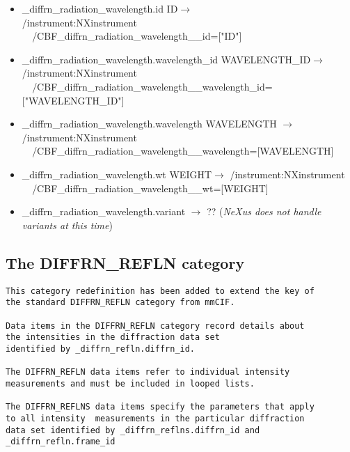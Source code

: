 \documentclass[11pt]{article}
\begin{document}
{{{\begin{verbatim}
\end{verbatim}}


\begin{itemize}

\item{\_diffrn\_radiation\_wavelength.id ID$\rightarrow$ \\
/instrument:NXinstrument \\
\verb|  |/CBF\_diffrn\_radiation\_wavelength\_\_id=["ID"]
}
\item{\_diffrn\_radiation\_wavelength.wavelength\_id WAVELENGTH\_ID$\rightarrow$ \\
/instrument:NXinstrument \\
\verb|  |/CBF\_diffrn\_radiation\_wavelength\_\_wavelength\_id=["WAVELENGTH\_ID"] \\
}
\item{\_diffrn\_radiation\_wavelength.wavelength WAVELENGTH $\rightarrow$ \\
/instrument:NXinstrument \\
\verb|  |/CBF\_diffrn\_radiation\_wavelength\_\_wavelength=[WAVELENGTH] \\
}
\item{\_diffrn\_radiation\_wavelength.wt WEIGHT$\rightarrow$
/instrument:NXinstrument \\
\verb|  |/CBF\_diffrn\_radiation\_wavelength\_\_wt=[WEIGHT] \\
}

\item{\_diffrn\_radiation\_wavelength.variant $\rightarrow$ ?? ({\it NeXus does not handle variants at this time})}
\end{itemize}

\subsection{The DIFFRN\_REFLN category}

\footnotesize{\begin{verbatim}
This category redefinition has been added to extend the key of
the standard DIFFRN_REFLN category from mmCIF.

Data items in the DIFFRN_REFLN category record details about
the intensities in the diffraction data set
identified by _diffrn_refln.diffrn_id.

The DIFFRN_REFLN data items refer to individual intensity
measurements and must be included in looped lists.

The DIFFRN_REFLNS data items specify the parameters that apply
to all intensity  measurements in the particular diffraction
data set identified by _diffrn_reflns.diffrn_id and
_diffrn_refln.frame_id
    

\end{verbatim}}}}
\end{document}
